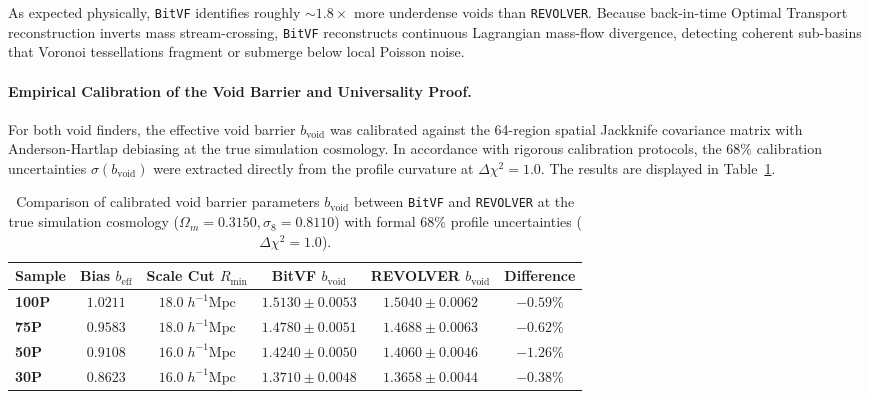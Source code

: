 \documentclass[12pt]{report}
\begin{document}
As expected physically, \texttt{BitVF} identifies roughly $\sim 1.8\times$ more underdense voids than \texttt{REVOLVER}. Because back-in-time Optimal Transport reconstruction inverts mass stream-crossing, \texttt{BitVF} reconstructs continuous Lagrangian mass-flow divergence, detecting coherent sub-basins that Voronoi tessellations fragment or submerge below local Poisson noise.

\paragraph{Empirical Calibration of the Void Barrier and Universality Proof.}
For both void finders, the effective void barrier $b_{\mathrm{void}}$ was calibrated against the 64-region spatial Jackknife covariance matrix with Anderson-Hartlap debiasing at the true simulation cosmology. In accordance with rigorous calibration protocols, the $68\%$ calibration uncertainties $\sigma(b_{\mathrm{void}})$ were extracted directly from the profile curvature at $\Delta \chi^2 = 1.0$. The results are displayed in Table~\ref{tab:barrier_comparison_table}.

\begin{table}[H]
    \centering
    \caption{Comparison of calibrated void barrier parameters $b_{\mathrm{void}}$ between \texttt{BitVF} and \texttt{REVOLVER} at the true simulation cosmology ($\Omega_m = 0.3150, \sigma_8 = 0.8110$) with formal $68\%$ profile uncertainties ($\Delta \chi^2 = 1.0$).}
    \label{tab:barrier_comparison_table}
    \begin{tabular}{lccccc}
        \toprule
        \textbf{Sample} & \textbf{Bias $b_{\mathrm{eff}}$} & \textbf{Scale Cut $R_{\mathrm{min}}$} & \textbf{BitVF $b_{\mathrm{void}}$} & \textbf{REVOLVER $b_{\mathrm{void}}$} & \textbf{Difference} \\
        \midrule
        \textbf{100P} & $1.0211$ & $18.0\;h^{-1}\mathrm{Mpc}$ & $1.5130 \pm 0.0053$ & $\mathbf{1.5040 \pm 0.0062}$ & $-0.59\%$ \\
        \textbf{75P}  & $0.9583$ & $18.0\;h^{-1}\mathrm{Mpc}$ & $1.4780 \pm 0.0051$ & $\mathbf{1.4688 \pm 0.0063}$ & $-0.62\%$ \\
        \textbf{50P}  & $0.9108$ & $16.0\;h^{-1}\mathrm{Mpc}$ & $1.4240 \pm 0.0050$ & $\mathbf{1.4060 \pm 0.0046}$ & $-1.26\%$ \\
        \textbf{30P}  & $0.8623$ & $16.0\;h^{-1}\mathrm{Mpc}$ & $1.3710 \pm 0.0048$ & $\mathbf{1.3658 \pm 0.0044}$ & $-0.38\%$ \\
        \bottomrule
    \end{tabular}
\end{table}
\end{document}

